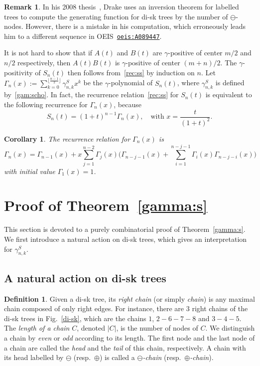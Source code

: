 \documentclass[12pt]{amsart}
\numberwithin{equation}{section}
\theoremstyle{plain}
\newtheorem{corollary}[theorem]{Corollary}
\theoremstyle{definition}
\newtheorem{Def}[theorem]{Definition}
\newtheorem{remark}[theorem]{Remark}
\begin{document}
\begin{remark}
In his 2008 thesis~\cite[Example~1.6.7]{dra}, Drake uses an inversion  theorem for labelled trees to compute the generating function for di-sk trees by the number of $\ominus$-nodes. However, there is a mistake in his computation, which erroneously leads him to a different sequence in OEIS~\href{https://oeis.org/A089447}{\tt{oeis:A089447}}.
\end{remark}


It is not hard to show that if $A(t)$ and $B(t)$ are $\gamma$-positive of center $m/2$ and $n/2$ respectively, then $A(t)B(t)$ is $\gamma$-positive of center 
 $(m+n)/2$.
The $\gamma$-positivity of $S_n(t)$ then follows from~\eqref{rec:ss} by induction on $n$. 
Let $\Gamma_n(x):=\sum_{k=0}^{\lfloor\frac{n-1}{2}\rfloor}\gamma_{n,k}^Sx^k$ be the $\gamma$-polynomial of $S_n(t)$, where $\gamma_{n,k}^S$ is defined by~\eqref{gam:scho}. In fact, the recurrence relation~\eqref{rec:ss} for $S_n(t)$ is equivalent to the following recurrence for $\Gamma_n(x)$, because 
$$
S_n(t)=(1+t)^{n-1}\Gamma_n(x),\quad\text{with $x=\frac{t}{(1+t)^2}$}.
$$
\begin{corollary}The recurrence relation for $\Gamma_n(x)$ is
$$
\Gamma_n(x)=\Gamma_{n-1}(x)+x\sum_{j=1}^{n-2}\Gamma_j(x)\biggl(\Gamma_{n-j-1}(x)+\sum_{i=1}^{n-j-1}\Gamma_i(x)\Gamma_{n-j-i}(x)\biggr)
$$
with initial value $\Gamma_1(x)=1$.
\end{corollary}

 







\section{Proof of Theorem~\ref{gamma:s}}\label{sec:gammasep}


This section is devoted to a purely combinatorial  proof of Theorem~\ref{gamma:s}. We first introduce a natural action on di-sk trees, which gives an interpretation  for $\gamma^S_{n,k}$.

\subsection{A natural action on di-sk trees}
\begin{Def}
Given a di-sk tree, its {\em right chain} (or simply {\em chain}) is any maximal chain composed of only right edges. For instance, there are $3$ right chains of the di-sk trees in Fig.~\ref{di-sk}, which are the chains $1$, $2-6-7-8$ and $3-4-5$. The {\em length of a  chain} $C$, denoted $|C|$, is the number of nodes of $C$. We distinguish a chain by {\em even} or {\em odd} according to its length. The first node and the last node of a chain are called the {\em head} and the {\em tail} of this chain, respectively. A chain with its head labelled by $\ominus$ (resp.~$\oplus$) is called a {\em$\ominus$-chain} (resp.~{\em$\oplus$-chain}).
\end{Def}
\end{document}
